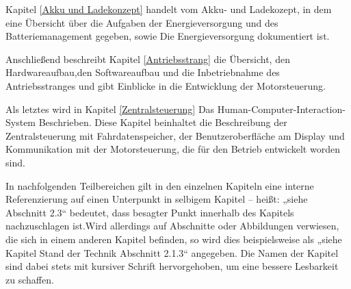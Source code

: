 Kapitel \ref{Akku und Ladekonzept} handelt vom Akku- und Ladekozept, in dem eine Übersicht über die Aufgaben der Energieversorgung und des Batteriemanagement gegeben, sowie Die Energieversorgung dokumentiert ist. 

Anschließend beschreibt Kapitel \ref{Antriebsstrang} die Übersicht, den Hardwareaufbau,den Softwareaufbau und die Inbetriebnahme des Antriebsstranges und gibt Einblicke in die Entwicklung der Motorsteuerung. 

Als letztes wird in Kapitel \ref{Zentralsteuerung} Das Human-Computer-Interaction-System Beschrieben. Diese Kapitel beinhaltet die Beschreibung der Zentralsteuerung mit Fahrdatenspeicher, der Benutzeroberfläche am Display und Kommunikation mit der Motorsteuerung, die für den Betrieb entwickelt worden sind.

In nachfolgenden Teilbereichen gilt in den einzelnen Kapiteln eine interne Referenzierung auf einen Unterpunkt in selbigem Kapitel – heißt: „siehe Abschnitt 2.3“ bedeutet, dass besagter Punkt innerhalb des Kapitels nachzuschlagen ist.Wird allerdings auf Abschnitte oder Abbildungen verwiesen, die sich in einem anderen Kapitel befinden, so wird dies beispielsweise als „siehe Kapitel Stand der Technik Abschnitt 2.1.3“ angegeben. Die Namen der Kapitel sind dabei stets mit kursiver Schrift hervorgehoben, um eine bessere Lesbarkeit zu schaffen.